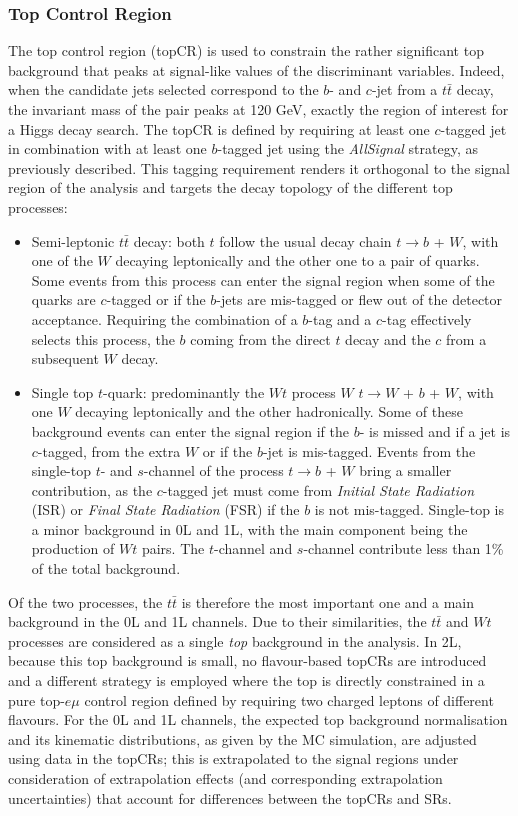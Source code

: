 \subsubsection{Top Control Region}
The top control region (topCR) is used to constrain the rather significant top background that peaks at signal-like values of the discriminant variables. Indeed, when the candidate jets selected correspond to the $b$- and $c$-jet from a $t\bar{t}$ decay, the invariant mass of the pair peaks at 120 GeV, exactly the region of interest for a Higgs decay search. The topCR is defined by requiring at least one $c$-tagged jet in combination with at least one $b$-tagged jet using the \textit{AllSignal} strategy, as previously described. This tagging requirement renders it orthogonal to the signal region of the analysis and targets the decay topology of the different top processes: 
\begin{itemize}
\item Semi-leptonic $t\bar{t}$ decay: both $t$ follow the usual decay chain  $t \rightarrow b$ + $W$, with one of the $W$ decaying leptonically and the other one to a pair of quarks. Some events from this process can enter the signal region when some of the quarks are $c$-tagged or if the $b$-jets are mis-tagged or flew out of the detector acceptance. Requiring the combination of a $b$-tag and a $c$-tag effectively selects this process, the $b$ coming from the direct $t$ decay and the $c$ from a subsequent $W$ decay. 
\item Single top $t$-quark: predominantly the $Wt$ process $W$ $t \rightarrow W$ +  $b$ + $W$, with one $W$ decaying leptonically and the other hadronically. Some of these background events can enter the signal region if the $b$- is missed and if a jet is $c$-tagged, from the extra $W$ or if the $b$-jet is mis-tagged. Events from the single-top $t$- and $s$-channel of the process $t \rightarrow b$ + $W$ bring a smaller contribution, as the $c$-tagged jet must come from \textit{Initial State Radiation} (ISR) or \textit{Final State Radiation} (FSR) if the $b$ is not mis-tagged. Single-top is a minor background in 0L and 1L, with the main component being the production of $Wt$ pairs. The $t$-channel and $s$-channel contribute less than 1\% of the total background.
\end{itemize}

Of the two processes, the $t\bar{t}$ is therefore the most important one and a main background in the 0L and 1L channels. Due to their similarities, the $t\bar{t}$ and $Wt$ processes are considered as a single \textit{top} background in the analysis. In 2L, because this top background is small, no flavour-based topCRs are introduced and a different strategy is employed where the top is directly constrained in a pure top-$e\mu$ control region defined by requiring two charged leptons of different flavours. For the 0L and 1L channels, the expected top background normalisation and its kinematic distributions, as given by the MC simulation, are adjusted using data in the topCRs; this is extrapolated to the signal regions under consideration of extrapolation effects (and corresponding extrapolation uncertainties) that account for differences between the topCRs and SRs. \\

